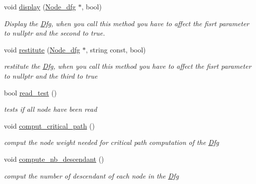 \begin{DoxyCompactItemize}
void \mbox{\hyperlink{class_dfg_a19e39ead57755ba83008c3938c2b4c5d}{display}} (\mbox{\hyperlink{class_node__dfg}{Node\+\_\+dfg}} $\ast$, bool)
\begin{DoxyCompactList}\small\item\em Display the \mbox{\hyperlink{class_dfg}{Dfg}}, when you call this method you have to affect the fisrt parameter to nullptr and the second to true. \end{DoxyCompactList}\item 
\mbox{\label{class_dfg_a2598772fa5761e77dcb975048775602b}} 
void \mbox{\hyperlink{class_dfg_a2598772fa5761e77dcb975048775602b}{restitute}} (\mbox{\hyperlink{class_node__dfg}{Node\+\_\+dfg}} $\ast$, string const, bool)
\begin{DoxyCompactList}\small\item\em restitute the \mbox{\hyperlink{class_dfg}{Dfg}}, when you call this method you have to affect the fisrt parameter to nullptr and the third to true \end{DoxyCompactList}\item 
\mbox{\label{class_dfg_a1a6dc2d38709c345177eec0d37ec43e2}} 
bool \mbox{\hyperlink{class_dfg_a1a6dc2d38709c345177eec0d37ec43e2}{read\+\_\+test}} ()
\begin{DoxyCompactList}\small\item\em tests if all node have been read \end{DoxyCompactList}\item 
\mbox{\label{class_dfg_af2212e74538c7e41980e8290b1981072}} 
void \mbox{\hyperlink{class_dfg_af2212e74538c7e41980e8290b1981072}{comput\+\_\+critical\+\_\+path}} ()
\begin{DoxyCompactList}\small\item\em comput the node weight needed for critical path computation of the \mbox{\hyperlink{class_dfg}{Dfg}} \end{DoxyCompactList}\item 
\mbox{\label{class_dfg_ae2a0906df6dcb5831ec2201a071debe2}} 
void \mbox{\hyperlink{class_dfg_ae2a0906df6dcb5831ec2201a071debe2}{compute\+\_\+nb\+\_\+descendant}} ()
\begin{DoxyCompactList}\small\item\em comput the number of descendant of each node in the \mbox{\hyperlink{class_dfg}{Dfg}} \end{DoxyCompactList}\item 

\end{DoxyCompactItemize}
